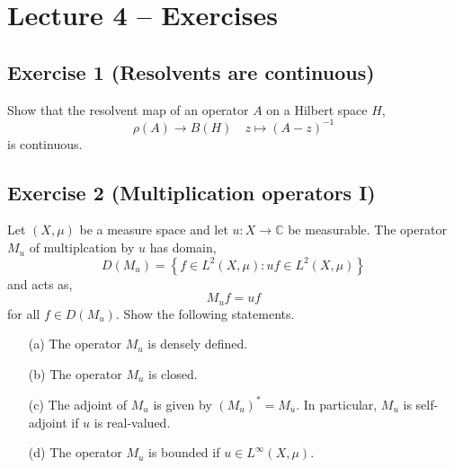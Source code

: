 \section{Lecture 4 -- Exercises}

\subsection{Exercise 1 (Resolvents are continuous)}

Show that the resolvent map of an operator $A$ on a Hilbert space $H$,
\begin{equation*}
	\rho(A)\to B(H) \quad z\mapsto (A-z)^{-1}
\end{equation*}
is continuous.

\subsection{Exercise 2 (Multiplication operators I)}

Let $(X,\mu)$ be a measure space and let $u:X\to\mathbb{C}$ be measurable. The operator $M_{u}$ of multiplcation by $u$ has domain,
\begin{equation*}
	D(M_{u}) = \left\{f\in L^{2}(X,\mu)\colon uf\in L^{2}(X,\mu)\right\}
\end{equation*}
and acts as,
\begin{equation*}
	M_{u}f = uf
\end{equation*}
for all $f\in D(M_{u})$. Show the following statements.
\begin{itemize}
	\item [(a)]
		The operator $M_{u}$ is densely defined.
	\item [(b)]
		The operator $M_{u}$ is closed.
	\item [(c)]
		The adjoint of $M_{u}$ is given by $(M_{u})^{*} = M_{\overline{u}}$. In particular, $M_{u}$ is self-adjoint if $u$ is real-valued.
	\item [(d)]
		The operator $M_{u}$ is bounded if $u\in L^{\infty}(X,\mu)$.
\end{itemize}

